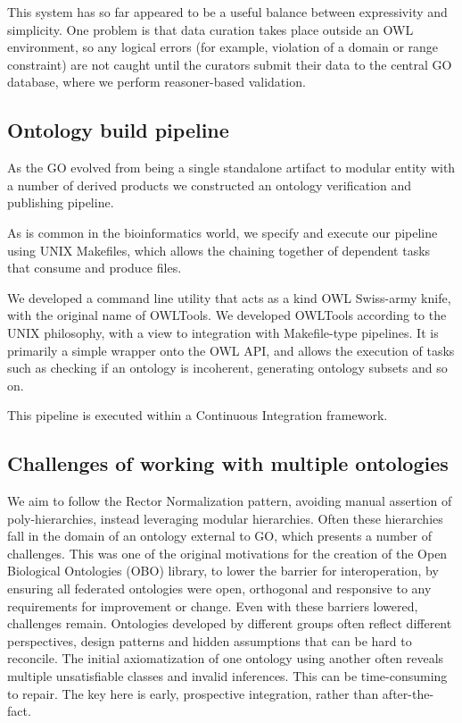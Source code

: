 \documentclass{llncs}
\begin{document}
This system has so far appeared to be a useful balance between
expressivity and simplicity. One problem is that data curation takes
place outside an OWL environment, so any logical errors (for example,
violation of a domain or range constraint) are not caught until the
curators submit their data to the central GO database, where we
perform reasoner-based validation.


\subsection{Ontology build pipeline}

As the GO evolved from being a single standalone artifact to modular
entity with a number of derived products we constructed an ontology
verification and publishing pipeline.

As is common in the bioinformatics world, we specify and execute our
pipeline using UNIX Makefiles, which allows the chaining together of
dependent tasks that consume and produce files.

We developed a command line utility that acts as a kind OWL Swiss-army
knife, with the original name of OWLTools. We developed
OWLTools according to the UNIX philosophy, with a view to integration
with Makefile-type pipelines. It is primarily a simple wrapper onto
the OWL API, and allows the execution of tasks such as checking if an
ontology is incoherent, generating ontology subsets and so on.

This pipeline is executed within a Continuous Integration
framework\cite{Mungall2012a}.

\subsection{Challenges of working with multiple ontologies}

We aim to follow the Rector Normalization pattern, avoiding manual
assertion of poly-hierarchies, instead leveraging modular
hierarchies. Often these hierarchies fall in the domain of an ontology
external to GO, which presents a number of challenges. This was one of
the original motivations for the creation of the Open Biological
Ontologies (OBO) library, to lower the barrier for interoperation, by
ensuring all federated ontologies were open, orthogonal and responsive
to any requirements for improvement or change. Even with these
barriers lowered, challenges remain. Ontologies developed by different
groups often reflect different perspectives, design patterns and
hidden assumptions that can be hard to reconcile. The initial
axiomatization of one ontology using another often reveals multiple
unsatisfiable classes and invalid inferences. This can be
time-consuming to repair. The key here is early, prospective
integration, rather than after-the-fact.
\end{document}
